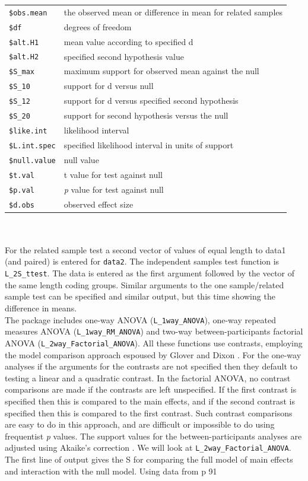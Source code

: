\begin{tabular}{ll}  
\texttt{\$obs.mean} & the observed mean or difference in mean for related samples\\  
\texttt{\$df} & degrees of freedom\\  
\texttt{\$alt.H1} & mean value according to specified d\\ 
\texttt{\$alt.H2} & specified second hypothesis value\\
\texttt{\$S\_max} & maximum support for observed mean against the null\\
\texttt{\$S\_10} & support for d versus null\\
\texttt{\$S\_12} & support for d versus specified second hypothesis\\
\texttt{\$S\_20} & support for second hypothesis versus the null\\
\texttt{\$like.int} & likelihood interval\\
\texttt{\$L.int.spec} & specified likelihood interval in units of support\\
\texttt{\$null.value} & null value\\
\texttt{\$t.val} & t value for test against null\\
\texttt{\$p.val} &\emph{p} value for test against null\\
\texttt{\$d.obs} & observed effect size\\
\end{tabular}\\\\
For the related sample test a second vector of values of equal length to data1 (and paired) is entered for \texttt{data2}.  The independent samples test function is \texttt{L\_2S\_ttest}. The data is entered as the first argument followed by the vector of the same length coding groups. Similar arguments to the one sample/related sample test can be specified and similar output, but this time showing the difference in means.\\
The package includes one-way ANOVA (\texttt{L\_1way\_ANOVA}), one-way repeated measures ANOVA (\texttt{L\_1way\_RM\_ANOVA}) and two-way between-participants factorial ANOVA (\texttt{L\_2way\_Factorial\_ANOVA}). All these functions use contrasts, employing the model comparison approach espoused by Glover and Dixon \citep{Dixon:2003,GloverDixon:2004,Dixon:2013}. For the one-way analyses if the arguments for the contrasts are not specified then they default to testing a linear and a quadratic contrast. In the factorial ANOVA, no contrast comparisons are made if the contrasts are left unspecified. If the first contrast is specified then this is compared to the main effects, and if the second contrast is specified then this is compared to the first contrast. Such contrast comparisons are easy to do in this approach, and are difficult or impossible to do using frequentist \emph{p} values. The support values for the between-participants analyses are adjusted using Akaike's correction \citep{HurvichTsai:1989}. We will look at \texttt{L\_2way\_Factorial\_ANOVA}. The first line of output gives the S for comparing the full model of main effects and interaction with the null model. Using data from \citet{Cahusac:2020} p 91\\

